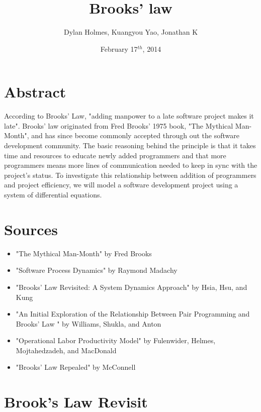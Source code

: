 \documentclass{article}
\author{Dylan Holmes, Kuangyou Yao, Jonathan K
}
\title{Brooks' law}
\date{February 17$^{th}$, 2014}
\begin{document}
\maketitle



\section*{Abstract}
According to Brooks' Law, "adding manpower to a late software project makes it late". Brooks' law originated from Fred Brooks' 1975 book, "The Mythical Man-Month", and has since become commonly accepted through out the software development community. The basic reasoning behind the principle is that it takes time and resources to educate newly added programmers and that more programmers means more lines of communication needed to keep in sync with the project's status. To investigate this relationship between addition of programmers and project efficiency, we will model a software development project using a system of differential equations.

\section*{Sources}
\begin{itemize}
    \item "The Mythical Man-Month" by Fred Brooks
    \item "Software Process Dynamics" by Raymond Madachy
    \item "Brooks’ Law Revisited: A System Dynamics Approach" by Hsia, Hsu, and Kung
    \item "An Initial Exploration of the Relationship Between Pair Programming and Brooks’ Law
" by Williams, Shukla, and Anton
    \item "Operational Labor Productivity Model" by Fulenwider, Helmes, Mojtahedzadeh, and MacDonald
    \item "Brooks’ Law Repealed" by McConnell
\end{itemize}


\section*{Brook's Law Revisit}
\end{document}
